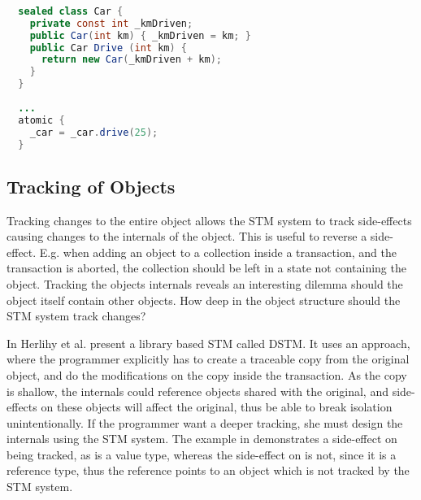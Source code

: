 %
\begin{lstlisting}[label=lst:tracking_variable,
  float,
  caption={Tracking Assignment to Variables},
  language=Java,  
  showspaces=false,
  showtabs=false,
  breaklines=true,
  showstringspaces=false,
  breakatwhitespace=true,
  commentstyle=\color{greencomments},
  keywordstyle=\color{bluekeywords},
  stringstyle=\color{redstrings},
  morekeywords={atomic, retry, orElse, var, get, set, sealed}]  % Start your code-block
  
  sealed class Car {
    private const int _kmDriven;
    public Car(int km) { _kmDriven = km; }
    public Car Drive (int km) { 
      return new Car(_kmDriven + km); 
    }
  }
  
  ...
  atomic {
    _car = _car.drive(25);
  }
\end{lstlisting}
%
\subsection{Tracking of Objects}
Tracking changes to the entire object allows the \ac{STM} system to track side-effects causing changes to the internals of the object. This is useful to reverse a side-effect. E.g. when adding an object to a collection inside a transaction, and the transaction is aborted, the collection should be left in a state not containing the object. Tracking the objects internals reveals an interesting dilemma should the object itself contain other objects. How deep in the object structure should the \ac{STM} system track changes? 

In \cite{herlihy2003software} Herlihy et al. present a library based \ac{STM} called \ac{DSTM}. It uses an approach, where the programmer explicitly has to create a traceable copy from the original object, and do the modifications on the copy inside the transaction. As the copy is shallow, the internals could reference objects shared with the original, and side-effects on these objects will affect the original, thus be able to break isolation unintentionally. If the programmer want a deeper tracking, she must design the internals using the \ac{STM} system. The example in  demonstrates a side-effect on  being tracked, as  is a value type, whereas the side-effect on  is not, since it is a reference type, thus the reference points to an object which is not tracked by the \ac{STM} system.

